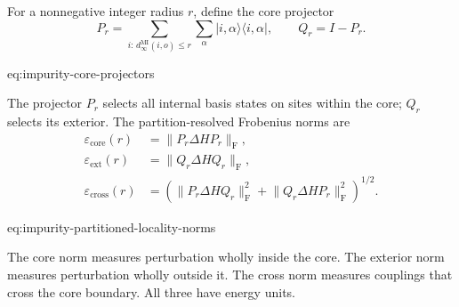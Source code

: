 For a nonnegative integer radius $r$, define the core projector
\begin{equation}
    P_r
    =
    \sum_{i:\,d_{\infty}^{\mathrm{MI}}(i,o)\leq r}
    \sum_{\alpha}
    \lvert i,\alpha\rangle\langle i,\alpha\rvert,
    \qquad
    Q_r=I-P_r.
    \label{eq:impurity-core-projectors}
\end{equation}
\begin{equationterms}{eq:impurity-core-projectors}
\end{equationterms}
The projector $P_r$ selects all internal basis states on sites within the core;
$Q_r$ selects its exterior. The partition-resolved Frobenius norms are
\begin{align}
    \varepsilon_{\mathrm{core}}(r)
    &=\lVert P_r\Delta H P_r\rVert_{\mathrm F},
    \\
    \varepsilon_{\mathrm{ext}}(r)
    &=\lVert Q_r\Delta H Q_r\rVert_{\mathrm F},
    \\
    \varepsilon_{\mathrm{cross}}(r)
    &=
    \left(
      \lVert P_r\Delta H Q_r\rVert_{\mathrm F}^{2}
      +
      \lVert Q_r\Delta H P_r\rVert_{\mathrm F}^{2}
    \right)^{1/2}.
    \label{eq:impurity-partitioned-locality-norms}
\end{align}
\begin{equationterms}{eq:impurity-partitioned-locality-norms}
\end{equationterms}
The core norm measures perturbation wholly inside the core. The exterior norm
measures perturbation wholly outside it. The cross norm measures couplings that
cross the core boundary. All three have energy units.


